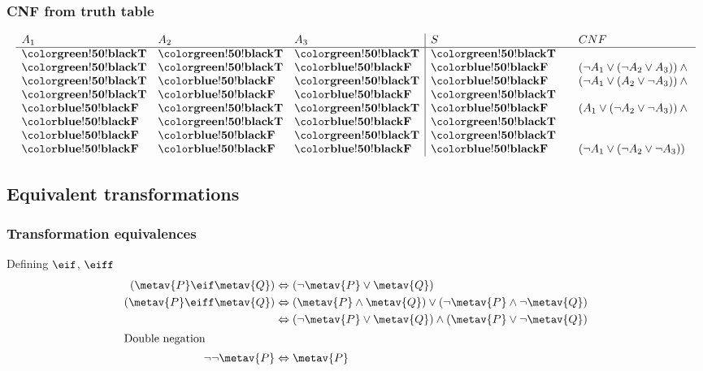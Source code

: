 \begin{frame}
  \frametitle{CNF from truth table}
\[
\begin{array}{lll|l@{\qquad}l}
A_1 & A_2 & A_3 & S & CNF\\
\hline
\True & \True & \True & \True & \\
\True & \True & \False & \False & (\lnot A_1 \lor (\lnot A_2 \lor A_3)) \land {}\\
\True & \False & \True & \False & (\lnot A_1 \lor (A_2 \lor \lnot A_3)) \land {}\\
\True & \False & \False & \True \\
\False & \True & \True & \False & (A_1 \lor (\lnot A_2 \lor \lnot A_3)) \land {}\\
\False & \True & \False & \True & \\
\False & \False & \True & \True & \\
\False & \False & \False & \False & (\lnot A_1 \lor (\lnot A_2 \lor \lnot A_3))
\end{array}\]
\end{frame}

\subsection{Equivalent transformations}

\begin{frame}
\frametitle{Transformation equivalences}

Defining $\eif$, $\eiff$
\begin{align*}
(\metav{P} \eif \metav{Q}) & \Leftrightarrow (\lnot\metav{P} \lor \metav{Q})\\
(\metav{P} \eiff \metav{Q}) & \Leftrightarrow (\metav{P} \land \metav{Q}) \lor (\lnot\metav{P} \land \lnot\metav{Q})\\
& \Leftrightarrow (\lnot \metav{P} \lor \metav{Q}) \land (\metav{P} \lor \lnot\metav{Q})\\
\intertext{Double negation}
\lnot\lnot\metav{P} & \Leftrightarrow \metav{P}
\end{align*}

\end{frame}

